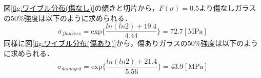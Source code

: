 図\ref{fig:ワイブル分布(傷なし)}の傾きと切片から，$F(\sigma)=0.5$より傷なしガラスの50\%強度は以下のように求められる．
\begin{equation}
    \sigma_{flawless} = \mathrm{exp}\lbrace \frac{ln(ln2) + 19.4}{4.44}\rbrace = 72.7[\mathrm{MPa}]
    \label{eq:傷なし50強度}
\end{equation}
同様に図\ref{fig:ワイブル分布(傷あり)}から，傷ありガラスの50\%強度は以下のように求められる．
\begin{equation}
    \sigma_{damaged} = \mathrm{exp}\lbrace \frac{ln(ln2) + 21.4}{5.56}\rbrace = 43.9[\mathrm{MPa}]
    \label{eq:傷あり50強度}
\end{equation}

\clearpage